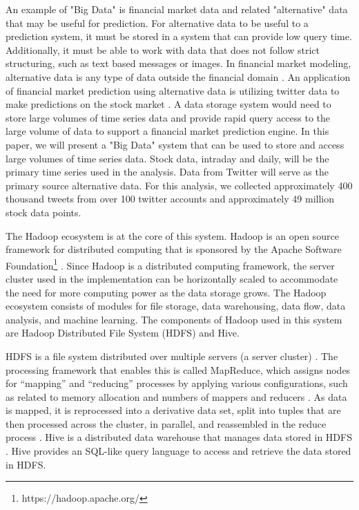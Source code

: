 \documentclass[journal]{IEEEtran}
\begin{document}

An example of "Big Data" is financial market data and
 related "alternative" data that may be useful for prediction.
For alternative data to be useful to a prediction system,
 it must be stored in a system that can provide low query time.
Additionally, it must be able to work with data that does not follow strict structuring,
 such as text based messages or images.
In financial market modeling, alternative data is any type of data outside the
 financial domain \cite{xiao2018trading}.
An application of financial market prediction using alternative data is
 utilizing twitter data to make predictions on the stock market \cite{twittermood}.
A data storage system would need to store large volumes of time series data and
 provide rapid query access to the large volume of data to support a financial 
 market prediction engine.
In this paper, we will present a "Big Data" system that can be used to store and
 access large volumes of time series data. 
Stock data, intraday and daily,
 will be the primary time series used in the analysis.
Data from Twitter will serve as the primary source alternative data.
For this analysis, we collected approximately 400 thousand tweets from over 100 twitter accounts and
 approximately 49 million stock data points.


The Hadoop ecosystem is at the core of this system.
Hadoop is an open source framework for distributed computing
 that is sponsored by the 
 Apache Software Foundation\footnote{https://hadoop.apache.org/} \cite{HDFSarchitecture}.
Since Hadoop is a distributed computing framework,
 the server cluster used in the implementation can be horizontally scaled to
 accommodate the need for more computing power as the data storage grows.
The Hadoop ecosystem consists of modules for file storage, data warehousing,
 data flow, data analysis, and machine learning.
The components of Hadoop used in this system are
 Hadoop Distributed File System (HDFS) and Hive.

HDFS is a file system distributed over multiple servers (a server cluster) \cite{HDFSarchitecture}.
The processing framework that enables this is called MapReduce, 
 which assigns nodes for ``mapping'' and ``reducing'' processes by applying  
 various configurations, such as related to memory allocation and numbers
 of mappers and reducers \cite{MappingReducing}.
As data is mapped, it is reprocessed into a derivative data set,
 split into tuples that are then processed across the cluster, in parallel,
 and reassembled in the reduce process \cite{MappingReducing}.
Hive is a distributed data warehouse that manages data stored in HDFS \cite{HDFSarchitecture}.
Hive provides an SQL-like query language to access and
 retrieve the data stored in HDFS.
\end{document}
